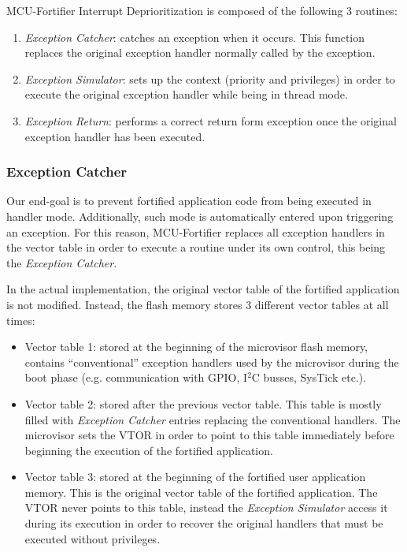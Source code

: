 \documentclass{article}
\begin{document}
MCU-Fortifier Interrupt Deprioritization is composed of the following 3 routines:
\begin{enumerate}
	\item \textit{Exception Catcher}: catches an exception when it occurs. This function replaces the original exception handler normally called by the exception.
	\item \textit{Exception Simulator}: sets up the context (priority and privileges) in order to execute the original exception handler while being in thread mode.
	\item \textit{Exception Return}: performs a correct return form exception once the original exception handler has been executed.
\end{enumerate}

\subsubsection{Exception Catcher}
Our end-goal is to prevent fortified application code from being executed in handler mode. Additionally, such mode is automatically entered upon triggering an exception. For this reason, MCU-Fortifier replaces all exception handlers in the vector table in order to execute a routine under its own control, this being the \textit{Exception Catcher}.

In the actual implementation, the original vector table of the fortified application is not modified. Instead, the flash memory stores 3 different vector tables at all times:
\begin{itemize}
	\item Vector table 1: stored at the beginning of the microvisor flash memory, contains ``conventional'' exception handlers used by the microvisor during the boot phase (e.g. communication with GPIO, I$^2$C busses, SysTick etc.).
	\item Vector table 2: stored after the previous vector table. This table is mostly filled with \textit{Exception Catcher} entries replacing the conventional handlers. The microvisor sets the VTOR in order to point to this table immediately before beginning the execution of the fortified application.
	\item Vector table 3: stored at the beginning of the fortified user application memory. This is the original vector table of the fortified application. The VTOR never points to this table, instead the \textit{Exception Simulator} access it during its execution in order to recover the original handlers that must be executed without privileges.
\end{itemize}
\end{document}
